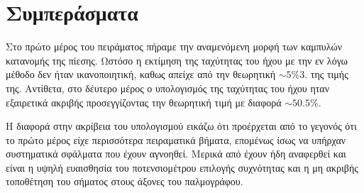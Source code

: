 \documentclass[a4paper]{article}
\begin{document}
\section*{Συμπεράσματα}
Στο πρώτο μέρος του πειράματος πήραμε την αναμενόμενη μορφή των καμπυλών κατανομής της πίεσης. Ωστόσο η εκτίμηση της ταχύτητας του ήχου με την εν λόγω μέθοδο δεν ήταν ικανοποιητική, καθως απείχε από την θεωρητική $\sim 5\%3.$ της τιμής της. Αντίθετα, στο δέυτερο μέρος ο υπολογισμός της ταχύτητας του ήχου ηταν εξαιρετικά ακριβής προσεγγίζοντας την θεωρητική τιμή με διαφορά $\sim 50.5\%$. 

Η διαφορά στην ακρίβεια του υπολογισμού εικάζω ότι προέρχεται από το γεγονός ότι το πρώτο μέρος είχε περισσότερα πειραματικά βήματα, επομένως ίσως να υπήρχαν συστηματικά σφάλματα που έχουν αγνοηθεί. Μερικά από έχουν ήδη αναφερθεί και είναι η υψηλή ευαισθησία του ποτενσιομέτρου επιλογής συχνότητας και η μη ακριβής τοποθέτηση του σήματος στους άξονες του παλμογράφου.
\end{document}
